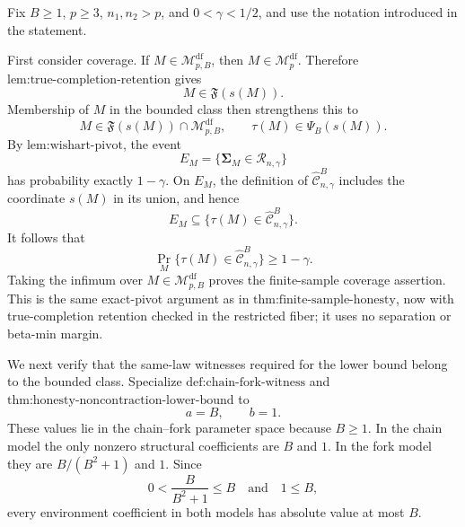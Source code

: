 Fix \(B\ge1\), \(p\ge3\), \(n_1,n_2>p\), and \(0<\gamma<1/2\), and use the notation introduced in the statement.

First consider coverage.  If \(M\in\mathcal M_{p,B}^{\mathrm{df}}\), then \(M\in\mathcal M_p^{\mathrm{df}}\).  Therefore \(\text{lem:true-completion-retention}\) gives
\[
M\in\mathfrak F(s(M)).
\]
Membership of \(M\) in the bounded class then strengthens this to
\[
M\in\mathfrak F(s(M))\cap\mathcal M_{p,B}^{\mathrm{df}},
\qquad
\tau(M)\in\Psi_B(s(M)).
\]
By \(\text{lem:wishart-pivot}\), the event
\[
E_M=\{\boldsymbol\Sigma_M\in\mathcal R_{n,\gamma}\}
\]
has probability exactly \(1-\gamma\).  On \(E_M\), the definition of \(\widehat{\mathcal C}^{B}_{n,\gamma}\) includes the coordinate \(s(M)\) in its union, and hence
\[
E_M\subseteq
\{\tau(M)\in\widehat{\mathcal C}^{B}_{n,\gamma}\}.
\]
It follows that
\[
\Pr_M\{\tau(M)\in\widehat{\mathcal C}^{B}_{n,\gamma}\}
\ge1-\gamma.
\]
Taking the infimum over \(M\in\mathcal M_{p,B}^{\mathrm{df}}\) proves the finite-sample coverage assertion.  This is the same exact-pivot argument as in \(\text{thm:finite-sample-honesty}\), now with true-completion retention checked in the restricted fiber; it uses no separation or beta-min margin.

We next verify that the same-law witnesses required for the lower bound belong to the bounded class.  Specialize \(\text{def:chain-fork-witness}\) and \(\text{thm:honesty-noncontraction-lower-bound}\) to
\[
a=B,
\qquad
b=1.
\]
These values lie in the chain--fork parameter space because \(B\ge1\).  In the chain model the only nonzero structural coefficients are \(B\) and \(1\).  In the fork model they are \(B/(B^2+1)\) and \(1\).  Since
\[
0<\frac{B}{B^2+1}\le B
\quad\text{and}\quad
1\le B,
\]
every environment coefficient in both models has absolute value at most \(B\).

